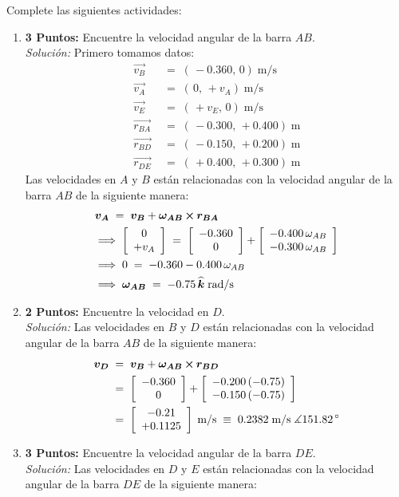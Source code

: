 \documentclass[ a4paper, twoside, 11pt]{article}
\begin{document}
\begin{problem}
Complete las siguientes actividades: 
\begin{enumerate}[label=\textbf{\alph*)}]
\item \textbf{3 Puntos:} Encuentre la velocidad angular de la barra $AB$. \\[1ex] \emph{Soluci\'on:} Primero tomamos datos: 
\begin{align*}
\vec{v_B} \; & = \; ( \, -0.360, \, 0) \; \text{m/s} \\
\vec{v_A} \; & = \; ( \, 0, \, +v_A) \; \text{m/s} \\
\vec{v_E} \; & = \; ( \, +v_E, \, 0 ) \; \text{m/s} \\
\vec{r_{BA}} \; & = \; ( \, -0.300, \, +0.400 ) \; \text{m} \\
\vec{r_{BD}} \; & = \; ( \, -0.150, \, +0.200 ) \; \text{m} \\
\vec{r_{DE}} \; & = \; ( \, +0.400, \, +0.300 ) \; \text{m}
\end{align*}
Las velocidades en $A$ y $B$ est\'an relacionadas con la velocidad angular de la barra $AB$ de la siguiente manera:
\begin{align*}
& {\boldsymbol{v_A}} \; = \; {\boldsymbol{v_B}} + {\boldsymbol{\omega_{AB}}} \,{\boldsymbol{\times}}\, {\boldsymbol{r_{BA}}} \\
& \Longrightarrow \; \left[ \begin{array}{c} 0 \\ +v_A \end{array} \right] \; = \; 
\left[ \begin{array}{c} -0.360 \\ 0 \end{array} \right] +
\left[ \begin{array}{c}  -0.400 \, \omega_{AB} \\  -0.300 \, \omega_{AB} \end{array} \right] \\
& \Longrightarrow \;
0 \; = \; -0.360 - 0.400 \, \omega_{AB} \\
& \Longrightarrow \;
{\boldsymbol{\omega_{AB}}} \; = \; -0.75 \, {\boldsymbol{\widehat{k}}} \; \text{rad/s}
\end{align*}
\item \textbf{2 Puntos:} Encuentre la velocidad en $D$. \\[1ex] \emph{Soluci\'on:} Las velocidades en $B$ y $D$ est\'an relacionadas con la velocidad angular de la barra $AB$ de la siguiente manera:
\begin{align*}
{\boldsymbol{v_D}} \; 
& = \; {\boldsymbol{v_B}} + {\boldsymbol{\omega_{AB}}} \,{\boldsymbol{\times}}\, {\boldsymbol{r_{BD}}} \\
& = \; \left[ \begin{array}{c} -0.360 \\ 0 \end{array} \right] +
\left[ \begin{array}{c}  -0.200 \, (-0.75) \\  -0.150 \, (-0.75) \end{array} \right] \\
& = \;
\left[ \begin{array}{c}  -0.21 \\  +0.1125 \end{array} \right] \; \text{m/s} \; \equiv \;
0.2382 \; \text{m/s} \; \measuredangle 151.82^{\,\circ}
\end{align*}
\item \textbf{3 Puntos:} Encuentre la velocidad angular de la barra $DE$. \\[1ex] \emph{Soluci\'on:} Las velocidades en $D$ y $E$ est\'an relacionadas con la velocidad angular de la barra $DE$ de la siguiente manera:

\end{enumerate}
\end{problem}
\end{document}
